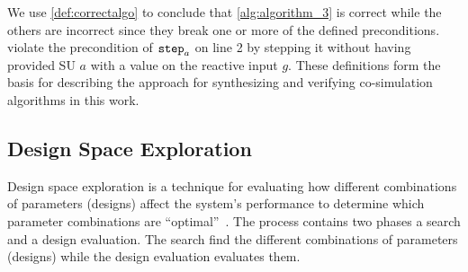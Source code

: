 We use \cref{def:correctalgo} to conclude that \cref{alg:algorithm_3} is correct while the others are incorrect since they break one or more of the defined preconditions. 
 violate the precondition of $\mathtt{step}_{a}$ on line 2 by stepping it without having provided SU $a$ with a value on the reactive input $g$. 
These definitions form the basis for describing the approach for synthesizing and verifying co-simulation algorithms in this work.

\subsection{Design Space Exploration}
Design space exploration is a technique for evaluating how different combinations of parameters (designs) affect the system's performance to determine which parameter combinations are ``optimal''~\cite{kang_approach_2011}.
The process contains two phases a search and a design evaluation.
The search find the different combinations of parameters (designs) while the design evaluation evaluates them.